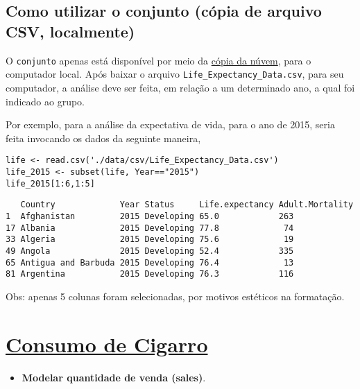 \documentclass[12pt]{abntex2}
\begin{document}
\subsection{Como utilizar o conjunto (cópia de arquivo CSV, localmente)}
\label{sec:orge5233e5}
O \texttt{conjunto} apenas está disponível por meio da \href{https://drive.google.com/file/d/1nUnOwgAcWIqoyG0P5\_wnlh1wPxxSUqv5/view?usp=sharing}{cópia da núvem}, para o
computador local. Após baixar o arquivo \texttt{Life\_Expectancy\_Data.csv},
para seu computador, a análise deve ser feita, em relação a um
determinado ano, a qual foi indicado ao grupo.

Por exemplo, para a análise da expectativa de vida, para o ano de
2015, seria feita invocando os dados da seguinte maneira,

\begin{verbatim}
life <- read.csv('./data/csv/Life_Expectancy_Data.csv')
life_2015 <- subset(life, Year=="2015")
life_2015[1:6,1:5] 
\end{verbatim}

\begin{verbatim}
   Country             Year Status     Life.expectancy Adult.Mortality
1  Afghanistan         2015 Developing 65.0            263            
17 Albania             2015 Developing 77.8             74            
33 Algeria             2015 Developing 75.6             19            
49 Angola              2015 Developing 52.4            335            
65 Antigua and Barbuda 2015 Developing 76.4             13            
81 Argentina           2015 Developing 76.3            116            
\end{verbatim}


Obs: apenas 5 colunas foram selecionadas, por motivos estéticos na formatação.

\section{\href{https://r-data.pmagunia.com/dataset/r-dataset-package-plm-cigar}{Consumo de Cigarro}}
\label{sec:org0d4e8c3}
\begin{itemize}
\item \textbf{Modelar quantidade de venda (sales)}.
\end{itemize}
\end{document}
